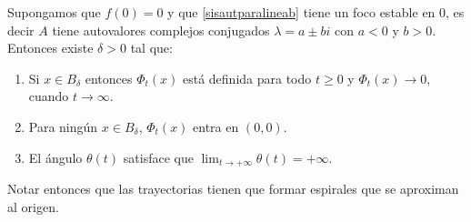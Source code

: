 \begin{teorema}[Focos]\label{teoremalineafocos} Supongamos que $f(0)=0$ y que
\eqref{sisautparalineab} tiene un foco estable en $0$, es decir
$A$ tiene autovalores complejos conjugados $\lambda=a\pm bi$ con
$a<0$ y $b>0$. Entonces existe $\delta>0$ tal que:

\begin{enumerate}
       \item\label{inc1c}  Si       $x\in B_{\delta}$ entonces $\Phi_t(x)$ está definida para todo $t\geq 0$
       y  $\Phi_t(x)\to 0$, cuando $t\to\infty$.

        \item\label{inc2c} Para ningún $x\in B_{\delta}$,  $\Phi_t(x)$ entra en $(0,0)$.
        \item\label{inc3c} El ángulo $\theta(t)$ satisface que
        $\lim_{t\to+\infty}\theta(t)=+\infty$.
\end{enumerate}
Notar entonces que las trayectorias tienen que formar espirales
que se aproximan al origen.
\end{teorema}

